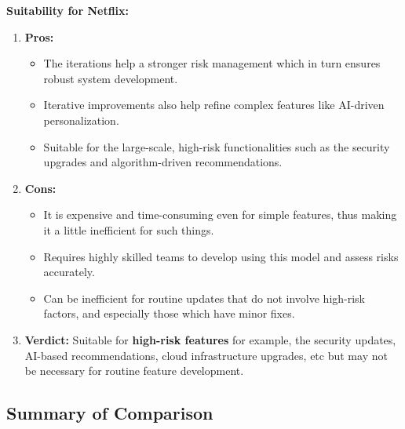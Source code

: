 \documentclass[a4paper,10pt,twoside]{article}
\begin{document}
\textbf{Suitability for Netflix:}
\begin{enumerate}
    \item \textbf{Pros:}
    \begin{itemize}
        \item The iterations help a stronger risk management which in turn ensures robust system development.
        \item Iterative improvements also help refine complex features like AI-driven personalization.
        \item Suitable for the large-scale, high-risk functionalities such as the security upgrades and algorithm-driven recommendations.
    \end{itemize}
    \item \textbf{Cons:}
    \begin{itemize}
        \item It is expensive and time-consuming even for simple features, thus making it a little inefficient for such things.
        \item Requires highly skilled teams to develop using this model and assess risks accurately.
        \item Can be inefficient for routine updates that do not involve high-risk factors, and especially those which have minor fixes.
    \end{itemize}
    \item \textbf{Verdict:} Suitable for \textbf{high-risk features} for example, the security updates, AI-based recommendations, cloud infrastructure upgrades, etc but may not be necessary for routine feature development.
\end{enumerate}
\pagebreak
\subsection{Summary of Comparison}
\begin{table}[h]
    \centering
    \setlength{\tabcolsep}{10pt}
    \renewcommand{\arraystretch}{1.5}
    \caption{Comparison of SDLC Models for Netflix}
\end{table}
\end{document}
